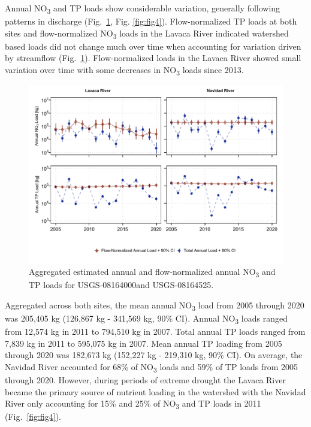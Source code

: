 \documentclass[fleqn,10pt,lineno]{wlpeerj} %
\providecommand{\DIFaddtex}[1]{{\protect\color{blue}\uwave{#1}}} %
\providecommand{\DIFaddFL}[1]{\DIFadd{#1}} %
\providecommand{\DIFaddbeginFL}{} %
\providecommand{\DIFaddendFL}{} %
\providecommand{\DIFdelbeginFL}{} %
\providecommand{\DIFdelendFL}{} %
\providecommand{\DIFadd}[1]{\texorpdfstring{\DIFaddtex{#1}}{#1}} %
\begin{document}
Annual NO\textsubscript{3} and TP loads show considerable variation,
generally following patterns in discharge (Fig.~\ref{fig:fig3}, Fig.
\ref{fig:fig4}). Flow-normalized TP loads at both sites and
flow-normalized NO\textsubscript{3} loads in the Lavaca River indicated
watershed based loads did not change much over time when accounting for
variation driven by streamflow (Fig.~\ref{fig:fig3}). Flow-normalized
loads in the Lavaca River showed small variation over time with some
decreases in NO\textsubscript{3} loads since 2013.

\begin{figure}

{\centering \DIFdelbeginFL %
\DIFdelendFL \DIFaddbeginFL \includegraphics[width=1\linewidth,]{Schramm-2023-08-PeerJ_files/figure-latex/fig3} 
\DIFaddendFL 

}

\caption{Aggregated estimated annual and flow-normalized annual NO\textsubscript{3} and TP loads for \DIFaddbeginFL \DIFaddFL{the Lavaca (}\DIFaddendFL USGS-08164000\DIFaddbeginFL \DIFaddFL{) }\DIFaddendFL and \DIFaddbeginFL \DIFaddFL{and Navidad (}\DIFaddendFL USGS-08164525\DIFaddbeginFL \DIFaddFL{) Rivers}\DIFaddendFL .}\label{fig:fig3}
\end{figure}

Aggregated across both sites, the mean annual NO\textsubscript{3} load
from 2005 through 2020 was 205,405 kg (126,867 kg - 341,569 kg, 90\%
CI). Annual NO\textsubscript{3} loads ranged from 12,574 kg in 2011 to
794,510 kg in 2007. Total annual TP loads ranged from 7,839 kg in 2011
to 595,075 kg in 2007. Mean annual TP loading from 2005 through 2020 was
182,673 kg (152,227 kg - 219,310 kg, 90\% CI). On average, the Navidad
River accounted for 68\% of NO\textsubscript{3} loads and 59\% of TP
loads from 2005 through 2020. However, during periods of extreme drought
the Lavaca River became the primary source of nutrient loading in the
watershed with the Navidad River only accounting for 15\% and 25\% of
NO\textsubscript{3} and TP loads in 2011 (Fig.~\ref{fig:fig4}).
\end{document}
